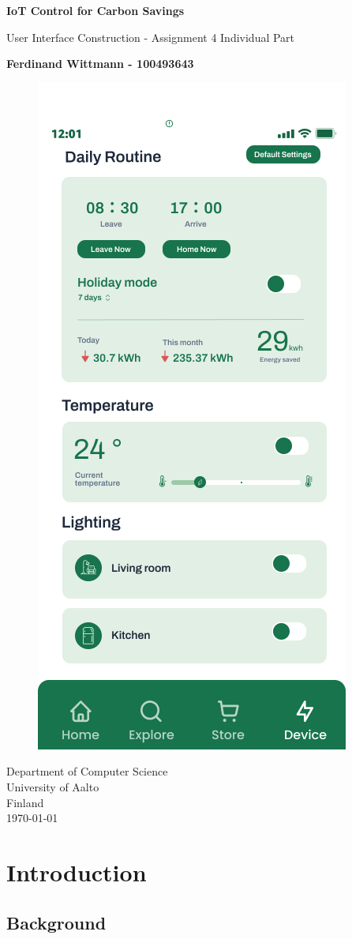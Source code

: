 \documentclass[]{interact}
\theoremstyle{plain}%
\theoremstyle{definition}
\theoremstyle{remark}
\begin{document}
\begin{titlepage}
  \begin{center}
    \vspace*{1cm}

    \Huge
    \textbf{IoT Control for Carbon Savings}
    \vspace{0.5cm}

    \vspace{0.5cm}
    \LARGE
    User Interface Construction - Assignment 4
    Individual Part


    \vspace{1.5cm}

    \textbf{Ferdinand Wittmann - 100493643}

    \vfill

    \begin{figure}[h]
      \centering
      \includegraphics[width=0.3\columnwidth]{img/Screen.png}
      \label{fig:Error}
    \end{figure}

    \vspace{0.8cm}
    \Large
    Department of Computer Science\\
    University of Aalto\\
    Finland\\
    \today

  \end{center}
\end{titlepage}

\section*{Introduction}

\subsection*{Background}
\end{document}
